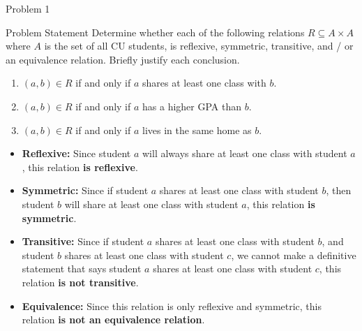 \begin{problem}{Problem 1}
    \begin{statement}{Problem Statement}
        Determine whether each of the following relations $R \subseteq A \times A$ where $A$ is the set of all CU students, is reflexive, symmetric, transitive, and / or an equivalence relation. Briefly 
        justify each conclusion.

        \begin{enumerate}[label = (\alph*)]
            \item $(a,b) \in R$ if and only if $a$ shares at least one class with $b$.
            \item $(a,b) \in R$ if and only if $a$ has a higher GPA than $b$.
            \item $(a,b) \in R$ if and only if $a$ lives in the same home as $b$.
        \end{enumerate}
    \end{statement}

    \begin{highlight}
        \begin{itemize}
            \item \textbf{Reflexive:} Since student $a$ will always share at least one class with student $a$, this relation \textbf{is reflexive}.
            \item \textbf{Symmetric:} Since if student $a$ shares at least one class with student $b$, then student $b$ will share at least one class with student $a$, this relation \textbf{is symmetric}.
            \item \textbf{Transitive:} Since if student $a$ shares at least one class with student $b$, and student $b$ shares at least one class with student $c$, we cannot make a definitive statement
            that says student $a$ shares at least one class with student $c$, this relation \textbf{is not transitive}.
            \item \textbf{Equivalence:} Since this relation is only reflexive and symmetric, this relation \textbf{is not an equivalence relation}.
        \end{itemize}
    \end{highlight}


\end{problem}
